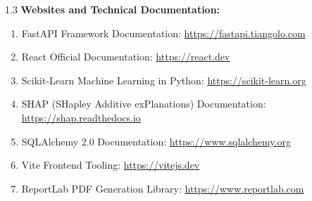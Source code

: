 \documentclass[12pt,a4paper]{article}
\begin{document}
\begin{spacing}{1.3}
\vspace{0.1in}
\noindent\textbf{Websites and Technical Documentation:}
\begin{enumerate}[leftmargin=20pt]
    \item FastAPI Framework Documentation: \url{https://fastapi.tiangolo.com}
    \item React Official Documentation: \url{https://react.dev}
    \item Scikit-Learn Machine Learning in Python: \url{https://scikit-learn.org}
    \item SHAP (SHapley Additive exPlanations) Documentation: \url{https://shap.readthedocs.io}
    \item SQLAlchemy 2.0 Documentation: \url{https://www.sqlalchemy.org}
    \item Vite Frontend Tooling: \url{https://vitejs.dev}
    \item ReportLab PDF Generation Library: \url{https://www.reportlab.com}
\end{enumerate}
\end{spacing}
\end{document}
